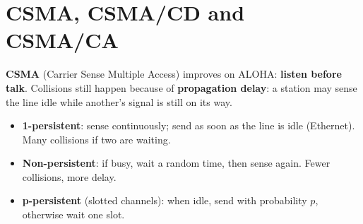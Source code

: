 \documentclass[10pt]{article}
\begin{document}
\section{CSMA, CSMA/CD and CSMA/CA}

\textbf{CSMA} (Carrier Sense Multiple Access) improves on ALOHA: \textbf{listen before talk}. Collisions still happen because of \textbf{propagation delay}: a station may sense the line idle while another's signal is still on its way.
\begin{itemize}
\item \textbf{1-persistent}: sense continuously; send as soon as the line is idle (Ethernet). Many collisions if two are waiting.
\item \textbf{Non-persistent}: if busy, wait a random time, then sense again. Fewer collisions, more delay.
\item \textbf{p-persistent} (slotted channels): when idle, send with probability $p$, otherwise wait one slot.
\end{itemize}
\end{document}
